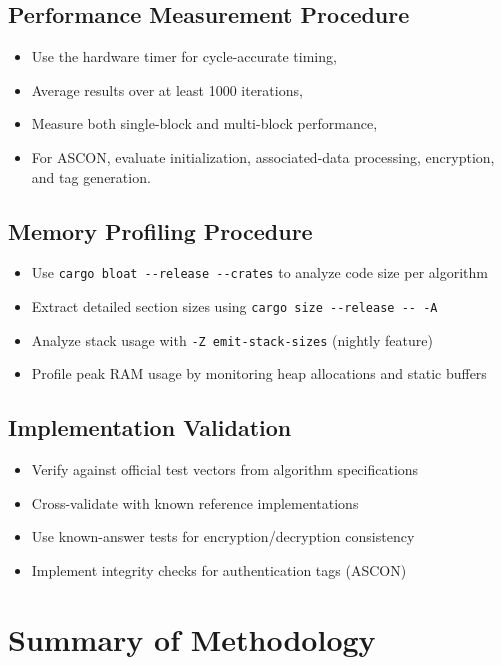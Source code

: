 \documentclass[12pt]{report}
\begin{document}
\subsection{Performance Measurement Procedure}

\begin{itemize}
    \item Use the hardware timer for cycle-accurate timing,
    \item Average results over at least 1000 iterations,
    \item Measure both single-block and multi-block performance,
    \item For ASCON, evaluate initialization, associated-data processing, encryption, and tag generation.
\end{itemize}

\subsection{Memory Profiling Procedure}

\begin{itemize}
    \item Use \texttt{cargo bloat {-}{-}release {-}{-}crates} to analyze code size per algorithm
    \item Extract detailed section sizes using \texttt{cargo size {-}{-}release {-}{-} -A}
    \item Analyze stack usage with \texttt{-Z emit-stack-sizes} (nightly feature)
    \item Profile peak RAM usage by monitoring heap allocations and static buffers
\end{itemize}

\subsection{Implementation Validation}

\begin{itemize}
    \item Verify against official test vectors from algorithm specifications
    \item Cross-validate with known reference implementations
    \item Use known-answer tests for encryption/decryption consistency
    \item Implement integrity checks for authentication tags (ASCON)
\end{itemize}

\section{Summary of Methodology}
\end{document}
